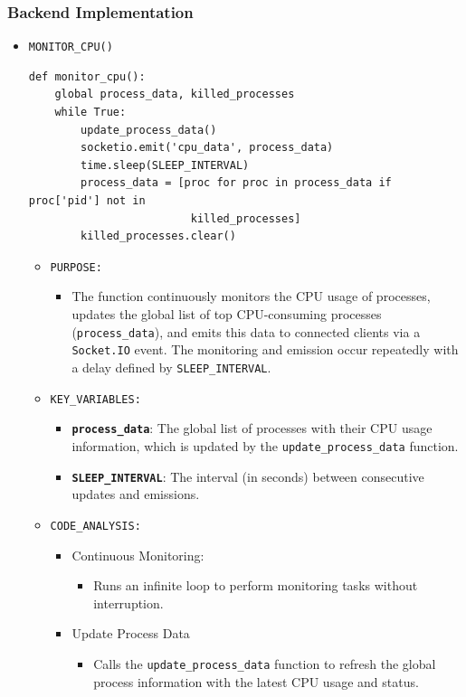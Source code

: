 \documentclass[12pt]{article}
\begin{document}
\subsubsection{Backend Implementation}
\begin{itemize}
    \item \texttt{MONITOR\_CPU()}
    \begin{verbatim}
def monitor_cpu():
    global process_data, killed_processes
    while True:
        update_process_data()
        socketio.emit('cpu_data', process_data) 
        time.sleep(SLEEP_INTERVAL)
        process_data = [proc for proc in process_data if proc['pid'] not in 
                         killed_processes]
        killed_processes.clear()  
\end{verbatim}

\begin{itemize}
    \item \texttt{PURPOSE:}
    \begin{itemize}
        \item The function continuously monitors the CPU usage of processes, updates the global list of top CPU-consuming processes (\texttt{process\_data}), and emits this data to connected clients via a \texttt{Socket.IO} event. The monitoring and emission occur repeatedly with a delay defined by \texttt{SLEEP\_INTERVAL}.
    \end{itemize}
    
   \item \texttt{KEY\_VARIABLES:}
   \begin{itemize}
    \item \textbf{\texttt{process\_data}}: The global list of processes with their CPU usage information, which is updated by the \texttt{update\_process\_data} function.
    \item \textbf{\texttt{SLEEP\_INTERVAL}}: The interval (in seconds) between consecutive updates and emissions.
\end{itemize}
   \item \texttt{CODE\_ANALYSIS:}
   \begin{itemize}
       \item Continuous Monitoring:
       \begin{itemize}
    \item Runs an infinite loop to perform monitoring tasks without interruption.
\end{itemize}

\item {Update Process Data}
\begin{itemize}
    \item Calls the \texttt{update\_process\_data} function to refresh the global process information with the latest CPU usage and status.
\end{itemize}


\end{itemize}
\end{itemize}
\end{itemize}
\end{document}
